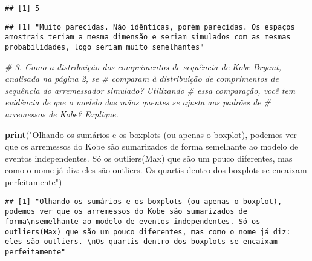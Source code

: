 \documentclass[]{article}
\newenvironment{Shaded}{\begin{snugshade}}{\end{snugshade}}
\newcommand{\KeywordTok}[1]{\textcolor[rgb]{0.13,0.29,0.53}{\textbf{#1}}}
\newcommand{\StringTok}[1]{\textcolor[rgb]{0.31,0.60,0.02}{#1}}
\newcommand{\CommentTok}[1]{\textcolor[rgb]{0.56,0.35,0.01}{\textit{#1}}}
\newcommand{\NormalTok}[1]{#1}
\begin{document}
\begin{verbatim}
## [1] 5
\end{verbatim}

\begin{Shaded}
\end{Shaded}

\begin{verbatim}
## [1] "Muito parecidas. Nâo idênticas, porém parecidas. Os espaços amostrais teriam a mesma dimensão e seriam simulados com as mesmas probabilidades, logo seriam muito semelhantes"
\end{verbatim}

\begin{Shaded}
\begin{Highlighting}[]
\CommentTok{# 3. Como a distribuição dos comprimentos de sequência de Kobe Bryant, analisada na página 2, se}
\CommentTok{# comparam à distribuição de comprimentos de sequência do arremessador simulado? Utilizando}
\CommentTok{# essa comparação, você tem evidência de que o modelo das mãos quentes se ajusta aos padrões de}
\CommentTok{# arremessos de Kobe? Explique.}

\KeywordTok{print}\NormalTok{(}\StringTok{"Olhando os sumários e os boxplots (ou apenas o boxplot), podemos ver que os arremessos do Kobe são sumarizados de forma}
\StringTok{semelhante ao modelo de eventos independentes. Só os outliers(Max) que são um pouco diferentes, mas como o nome já diz: eles são outliers. }
\StringTok{Os quartis dentro dos boxplots se encaixam perfeitamente"}\NormalTok{)}
\end{Highlighting}
\end{Shaded}

\begin{verbatim}
## [1] "Olhando os sumários e os boxplots (ou apenas o boxplot), podemos ver que os arremessos do Kobe são sumarizados de forma\nsemelhante ao modelo de eventos independentes. Só os outliers(Max) que são um pouco diferentes, mas como o nome já diz: eles são outliers. \nOs quartis dentro dos boxplots se encaixam perfeitamente"
\end{verbatim}
\end{document}
